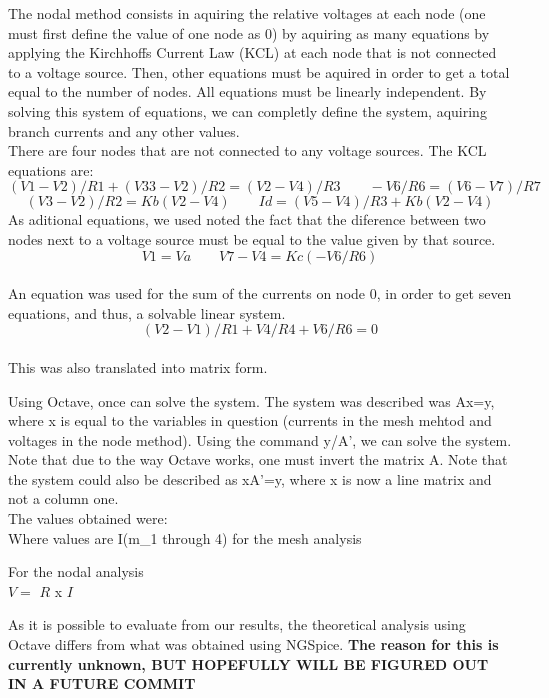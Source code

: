 The nodal method consists in aquiring the relative voltages at each node (one must first define the value of one node as 0) by aquiring as many equations by applying the Kirchhoffs Current Law (KCL) at each node that is not connected to a voltage source. Then, other equations must be aquired in order to get a total equal to the number of nodes. All equations must be linearly independent. By solving this system of equations, we can completly define the system, aquiring branch currents and any other values.\\
There are four nodes that are not connected to any voltage sources. The KCL equations are: 
\[(V1-V2)/R1+(V33-V2)/R2=(V2-V4)/R3 \quad \quad -V6/R6=(V6-V7)/R7\]
 \[(V3-V2)/R2=Kb(V2-V4) \quad \quad Id=(V5-V4)/R3+Kb(V2-V4) \]
As aditional equations, we used noted the fact that the diference between two nodes next to a voltage source must be equal to the value given by that source. 
\[V1=Va \quad \quad  V7-V4=Kc(-V6/R6)\]\\
An equation was used for the sum of the currents on node 0, in order to get seven equations, and thus, a solvable linear system.
 \[(V2-V1)/R1+V4/R4+V6/R6=0\]\\
This was also translated into matrix form.







Using Octave, once can solve the system. The system was described was Ax=y, where x is equal to the variables in question (currents in the mesh mehtod and voltages in the node method). Using the command y/A', we can solve the system. Note that due to the way Octave works, one must invert the matrix A. Note that the system could also be described as xA'=y, where x is now a line matrix and not a column one.\\
The values obtained were:\\


Where values are I(m\_1 through 4) for the mesh analysis


For the nodal analysis\\

$V =$  $R$ x $I$ 


As it is possible to evaluate from our results, the theoretical analysis using Octave differs from what was obtained using NGSpice. \textbf{The reason for this is currently unknown, BUT HOPEFULLY WILL BE FIGURED OUT IN A FUTURE COMMIT}
